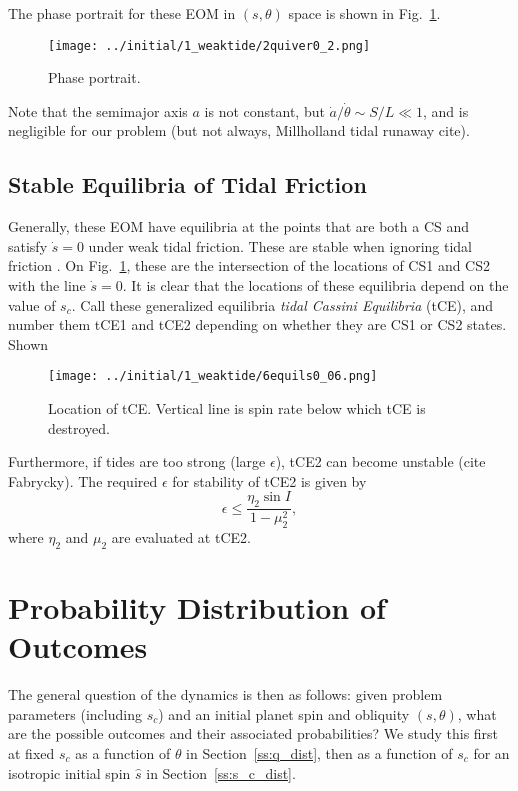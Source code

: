 \documentclass[twocolumn]{aastex63}
\newcommand*{\p}[1]{\left(#1\right)}
\begin{document}
The phase portrait for these EOM in $\p{s, \theta}$ space is shown in
Fig.~\ref{fig:quiver}.
\begin{figure}
    \centering
    \texttt{[image: ../initial/1\_weaktide/2quiver0\_2.png]}
    \caption{Phase portrait.}\label{fig:quiver}
\end{figure}
Note that the semimajor axis $a$ is not constant, but $\dot{a} / \dot{\theta}
\sim S / L \ll 1$, and is negligible for our problem (but not always,
Millholland tidal runaway cite).

\subsection{Stable Equilibria of Tidal Friction}\label{ss:tidal_eqs}

Generally, these EOM have equilibria at the points that are both a CS and
satisfy $\dot{s} = 0$ under weak tidal friction. These are stable when ignoring
tidal friction \citep{su2020}. On Fig.~\ref{fig:quiver}, these are the
intersection of the locations of CS1 and CS2 with the line $\dot{s} = 0$. It is
clear that the locations of these equilibria depend on the value of $s_c$. Call
these generalized equilibria \emph{tidal Cassini Equilibria} (tCE), and number
them tCE1 and tCE2 depending on whether they are CS1 or CS2 states. Shown
\begin{figure}
    \centering
    \texttt{[image: ../initial/1\_weaktide/6equils0\_06.png]}
    \caption{Location of tCE\@. Vertical line is spin rate below which tCE is
    destroyed.}\label{fig:6equils}
\end{figure}

Furthermore, if tides are too strong (large $\epsilon$), tCE2 can become
unstable (cite Fabrycky). The required $\epsilon$ for stability of tCE2 is given
by
\begin{equation}
    \epsilon \leq \frac{\eta_2 \sin I}{1 - \mu_2^2},
\end{equation}
where $\eta_2$ and $\mu_2$ are evaluated at tCE2.

\section{Probability Distribution of Outcomes}\label{s:sim}

The general question of the dynamics is then as follows: given problem
parameters (including $s_c$) and an initial planet spin and obliquity $(s,
\theta)$, what are the possible outcomes and their associated probabilities? We
study this first at fixed $s_c$ as a function of $\theta$ in
Section~\ref{ss:q_dist}, then as a function of $s_c$ for an isotropic initial
spin $\hat{s}$ in Section~\ref{ss:s_c_dist}.
\end{document}
